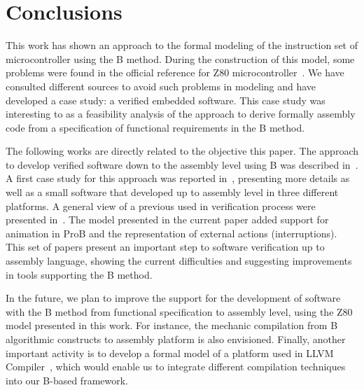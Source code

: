 \documentclass[a4paper]{llncs}
\begin{document}
 
\section{Conclusions}
\label{sec:conclusions} 

This work has shown an approach to the formal modeling of the
instruction set of microcontroller using the B method.  During the
construction of this model, some problems were found in the official
reference for Z80 microcontroller~\cite{Z80_manual}. We have consulted
different sources \cite{Simulator_z80,UndocumentedZ80,Z80_manual} to
avoid such problems in modeling and have developed a case study: a
verified embedded software.  This case study was interesting to as a
feasibility analysis of the approach to derive formally assembly code
from a specification of functional requirements in the B method.




The following works are directly related to the objective this paper.
The approach to develop verified software down to the assembly level
using B was described in~\cite{DantasSemish2008}. A first case study
for this approach was reported in~\cite{Dantas_SBMF08}, presenting
more details as well as a small software that developed up to assembly
level in three different platforms. A general view of a previous used
in verification process were presented in~\cite{Valerio_SBMF09}. The
model presented in the current paper added support for animation in
ProB and the representation of external actions (interruptions).
This set of papers present an important step to software verification
up to assembly language, showing the current difficulties and
suggesting improvements in tools supporting the B method.


In the future, we plan to improve the support for the development of
software with the B method from functional specification to assembly
level, using the Z80 model presented in this work. For instance, the
mechanic compilation from B algorithmic constructs to assembly
platform is also envisioned. Finally, another important activity is to
develop a formal model of a platform used in LLVM
Compiler~\cite{DBLP:conf/cgo/LattnerA04}, which would enable us to
integrate different compilation techniques into our B-based framework.
\end{document}
